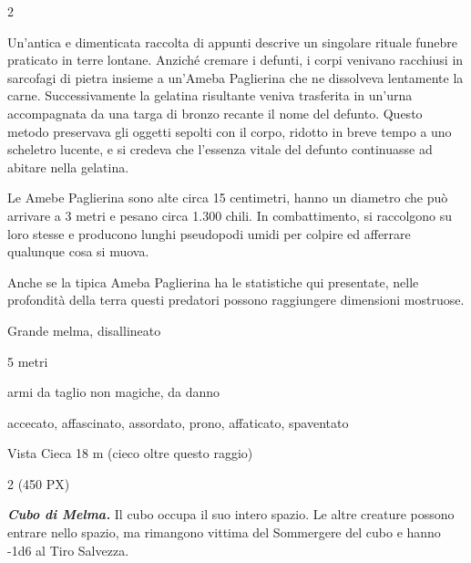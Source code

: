 \begin{multicols}{2}
{Un'antica e dimenticata raccolta di appunti descrive un singolare rituale funebre praticato in terre lontane. Anziché cremare i defunti, i corpi venivano racchiusi in sarcofagi di pietra insieme a un'Ameba Paglierina che ne dissolveva lentamente la carne. Successivamente la gelatina risultante veniva trasferita in un'urna accompagnata da una targa di bronzo recante il nome del defunto. Questo metodo preservava gli oggetti sepolti con il corpo, ridotto in breve tempo a uno scheletro lucente, e si credeva che l'essenza vitale del defunto continuasse ad abitare nella gelatina.

Le Amebe Paglierina sono alte circa 15 centimetri, hanno un diametro che può arrivare a 3 metri e pesano circa 1.300 chili. In combattimento, si raccolgono su loro stesse e producono lunghi pseudopodi umidi per colpire ed afferrare qualunque cosa si muova.

Anche se la tipica Ameba Paglierina ha le statistiche qui presentate, nelle profondità della terra questi predatori possono raggiungere dimensioni mostruose.


\begin{description}[noitemsep, topsep=0pt, parsep=0pt, partopsep=0pt, itemsep=1pt, leftmargin=2.35cm,  labelwidth=2.2cm, itemindent=0cm, listparindent=0pt] %
\setlength{\baselineskip}{10pt}
\item[\textbf{Taglia/Tipo}] Grande melma, disallineato
\item[\textbf{Caratt.}] 
\item[\textbf{Punti Ferita}] 
\item[\textbf{Movimento}] 5 metri
\item[\textbf{Tiri Salvez.}] 
\item[\textbf{Imm. Danni}] armi da taglio non magiche, da danno
\item[\textbf{Immunità}] accecato, affascinato, assordato, prono, affaticato, spaventato
\item[\textbf{Sensi}] Vista Cieca 18 m (cieco oltre questo raggio)
\item[\textbf{Sfida}] 2 (450 PX)
\end{description}
\smallskip

\emph{\textbf{Cubo di Melma.}} Il cubo occupa il suo intero spazio. Le altre creature possono entrare nello spazio, ma rimangono vittima del Sommergere del cubo e hanno -1d6 al Tiro Salvezza.

}
\end{multicols}
